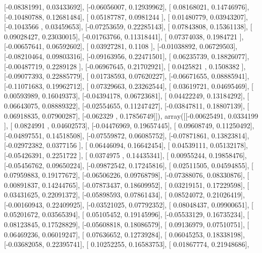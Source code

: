 \documentclass{article}
\begin{document}
       [-0.08381991,  0.03433692],
       [-0.06056007,  0.12939962],
       [ 0.08168021,  0.14746976],
       [-0.10480788,  0.12681484],
       [ 0.05187787,  0.0981244 ],
       [ 0.01480779,  0.03943207],
       [-0.1043566 ,  0.03459653],
       [-0.07253659,  0.22285143],
       [ 0.07843808,  0.15361138],
       [ 0.09028427,  0.23030015],
       [-0.01763766,  0.11318441],
       [ 0.07374038,  0.1984721 ],
       [-0.00657641,  0.06592602],
       [ 0.03927281,  0.1108    ],
       [-0.01038892,  0.06729503],
       [-0.08210464,  0.09803316],
       [-0.09163956,  0.22471501],
       [ 0.06235739,  0.18826077],
       [-0.00487719,  0.2289128 ],
       [-0.06967645,  0.21702921],
       [ 0.0425821 ,  0.1508382 ],
       [-0.09077393,  0.22885779],
       [ 0.01738593,  0.07620227],
       [-0.06671655,  0.08885941],
       [-0.11071683,  0.19962712],
       [ 0.07329663,  0.23262544],
       [ 0.03619721,  0.04695469],
       [ 0.00593989,  0.16049373],
       [-0.04394178,  0.06723681],
       [ 0.04422249,  0.13184292],
       [ 0.06643075,  0.08889322],
       [-0.02554655,  0.11247427],
       [-0.03847811,  0.18807139],
       [ 0.06918835,  0.07900287],
       [-0.062329  ,  0.17856749]]), array([[-0.00625491,  0.0334199 ],
       [ 0.0824991 ,  0.04602573],
       [-0.04476969,  0.19657445],
       [ 0.09608749,  0.11250492],
       [-0.04897551,  0.14518508],
       [-0.07559872,  0.06085752],
       [-0.07871861,  0.13823814],
       [-0.02972382,  0.0377156 ],
       [ 0.06446094,  0.16642454],
       [ 0.04539111,  0.05132178],
       [-0.05426391,  0.2251722 ],
       [ 0.0374975 ,  0.14435341],
       [ 0.00955244,  0.19858476],
       [-0.05456762,  0.09650224],
       [-0.09872542,  0.17245816],
       [ 0.02511505,  0.04594855],
       [ 0.07959883,  0.19177672],
       [-0.06506226,  0.09768798],
       [-0.07388076,  0.08330876],
       [ 0.00891837,  0.14244765],
       [-0.07873437,  0.18609952],
       [ 0.03219151,  0.17229598],
       [ 0.03431625,  0.22091372],
       [-0.05898593,  0.07861434],
       [ 0.08524072,  0.21026419],
       [-0.00160943,  0.22409925],
       [-0.03521025,  0.07792352],
       [ 0.08048437,  0.09900651],
       [ 0.05201672,  0.03565394],
       [ 0.05105452,  0.19145996],
       [-0.05533129,  0.16735234],
       [ 0.08123845,  0.17528829],
       [-0.05608818,  0.18086579],
       [ 0.09136979,  0.07510751],
       [ 0.06469236,  0.06019247],
       [ 0.07636652,  0.12739284],
       [ 0.06045253,  0.18338198],
       [-0.03682058,  0.22395741],
       [ 0.10252255,  0.16583753],
       [ 0.01867774,  0.21948686],
\end{document}
